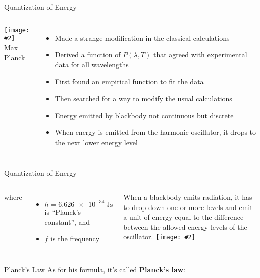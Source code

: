 \documentclass[12pt,compress,aspectratio=169]{beamer}
\newcommand{\pic}[2]{\texttt{[image: \#2]}}
\newcommand{\eq}[2]{\vspace{#1}{\Large\begin{displaymath}#2\end{displaymath}}}
\begin{document}
\begin{frame}{Quantization of Energy}
  \begin{columns}
    \pic{1}{20973-050-F6EEBFF1.jpg}\\
    Max Planck
    
    \begin{itemize}
    \item Made a strange modification in the classical calculations
    \item Derived a function of $P(\lambda,T)$ that agreed with experimental
      data for all wavelengths
    \item First found an empirical function to fit the data
    \item Then searched for a way to modify the usual calculations
    \item Energy emitted by blackbody not continuous but discrete
    \item When energy is emitted from the harmonic oscillator, it drops to the
      next lower energy level 
    \end{itemize}
  \end{columns}
\end{frame}

\begin{frame}{Quantization of Energy}
  \begin{columns}
    \eq{-.1in}{
      \boxed{E=hf}
    }

    \vspace{-.1in}where
    \begin{itemize}
    \item $h=\SI{6.626e-34}{\joule\second}$ is ``Planck's constant'', and 
    \item $f$ is the frequency
    \end{itemize}
    When a blackbody emits radiation, it has to drop down one or more levels
    and emit a unit of energy equal to the difference between the allowed
    energy levels of the oscillator. 
    \pic{1}{quantum.png}
  \end{columns}
\end{frame}


\begin{frame}{Planck's Law}
  As for his formula, it's called \textbf{Planck's law}:

  \eq{-.01in}{
    \boxed{
      P(\lambda,T)=\frac{2hc^2}{\lambda^5}\frac{1}{e^{\frac{hc}{\lambda k_BT}}-1}
    }
  }
\end{frame}
\end{document}
